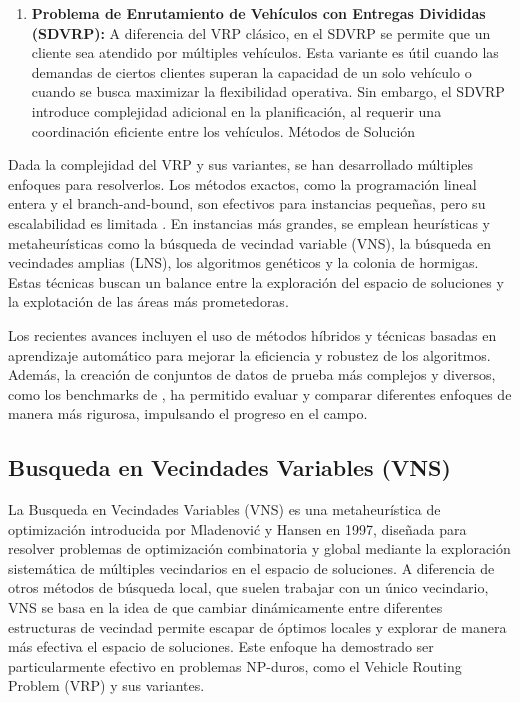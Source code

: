 \documentclass{article}
\begin{document}
\begin{enumerate}
\item
\textbf{Problema de Enrutamiento de Vehículos con Entregas Divididas (SDVRP):}
A diferencia del VRP clásico, en el SDVRP se permite que un cliente sea atendido por múltiples vehículos. Esta variante es útil cuando las demandas de ciertos clientes superan la capacidad de un solo vehículo o cuando se busca maximizar la flexibilidad operativa. Sin embargo, el SDVRP introduce complejidad adicional en la planificación, al requerir una coordinación eficiente entre los vehículos.
Métodos de Solución
\end{enumerate}

Dada la complejidad del VRP y sus variantes, se han desarrollado múltiples enfoques para resolverlos. Los métodos exactos, como la programación lineal entera y el branch-and-bound, son efectivos para instancias pequeñas, pero su escalabilidad es limitada \cite{ref5}. En instancias más grandes, se emplean heurísticas y metaheurísticas como la búsqueda de vecindad variable (VNS), la búsqueda en vecindades amplias (LNS)\cite{ref4}, los algoritmos genéticos y la colonia de hormigas.\cite{ref7} Estas técnicas buscan un balance entre la exploración del espacio de soluciones y la explotación de las áreas más prometedoras.

Los recientes avances incluyen el uso de métodos híbridos y técnicas basadas en aprendizaje automático para mejorar la eficiencia y robustez de los algoritmos. Además, la creación de conjuntos de datos de prueba más complejos y diversos, como los benchmarks de \cite{ref10}, ha permitido evaluar y comparar diferentes enfoques de manera más rigurosa, impulsando el progreso en el campo.
\subsection{Busqueda en Vecindades Variables (VNS)}

La Busqueda en Vecindades Variables (VNS) es una metaheurística de optimización introducida por Mladenović y Hansen en 1997, diseñada para resolver problemas de optimización combinatoria y global mediante la exploración sistemática de múltiples vecindarios en el espacio de soluciones. A diferencia de otros métodos de búsqueda local, que suelen trabajar con un único vecindario, VNS se basa en la idea de que cambiar dinámicamente entre diferentes estructuras de vecindad permite escapar de óptimos locales y explorar de manera más efectiva el espacio de soluciones. Este enfoque ha demostrado ser particularmente efectivo en problemas NP-duros, como el Vehicle Routing Problem (VRP) y sus variantes.
\end{document}
